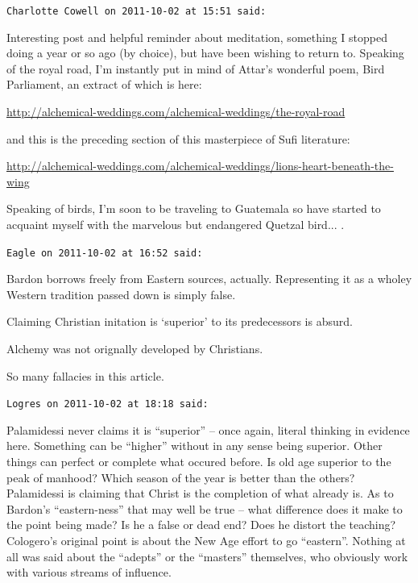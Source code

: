 \begin{footnotesize}
\begin{sffamily}
\texttt{Charlotte Cowell on 2011-10-02 at 15:51 said:}

Interesting post and helpful reminder about meditation, something I stopped doing a year or so ago (by choice), but have been wishing to return to. Speaking of the royal road, I'm instantly put in mind of Attar's wonderful poem, Bird Parliament, an extract of which is here:

\url{http://alchemical-weddings.com/alchemical-weddings/the-royal-road}


and this is the preceding section of this masterpiece of Sufi literature:

\url{http://alchemical-weddings.com/alchemical-weddings/lions-heart-beneath-the-wing}


Speaking of birds, I'm soon to be traveling to Guatemala so have started to acquaint myself with the marvelous but endangered Quetzal bird... .

\hfill

\texttt{Eagle on 2011-10-02 at 16:52 said:}

Bardon borrows freely from Eastern sources, actually. Representing it as a wholey Western tradition passed down is simply false.

Claiming Christian initation is `superior' to its predecessors is absurd.

Alchemy was not orignally developed by Christians.

So many fallacies in this article.

\hfill

\texttt{Logres on 2011-10-02 at 18:18 said:}

Palamidessi never claims it is ``superior'' -- once again, literal thinking in evidence here. Something can be ``higher'' without in any sense being superior. Other things can perfect or complete what occured before. Is old age superior to the peak of manhood? Which season of the year is better than the others? Palamidessi is claiming that Christ is the completion of what already is. As to Bardon's ``eastern-ness'' that may well be true -- what difference does it make to the point being made? Is he a false or dead end? Does he distort the teaching? Cologero's original point is about the New Age effort to go ``eastern''. Nothing at all was said about the ``adepts'' or the ``masters'' themselves, who obviously work with various streams of influence.

\hfill


\end{sffamily}
\end{footnotesize}
